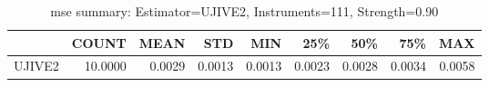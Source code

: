 \begin{table}[ht]
\centering
\caption{mse summary: Estimator=UJIVE2, Instruments=111, Strength=0.90}
\begin{tabular}{lrrrrrrrr}
\toprule
 & COUNT & MEAN & STD & MIN & 25\% & 50\% & 75\% & MAX \\
\midrule
UJIVE2 & 10.0000 & 0.0029 & 0.0013 & 0.0013 & 0.0023 & 0.0028 & 0.0034 & 0.0058 \\
\bottomrule
\end{tabular}
\end{table}
